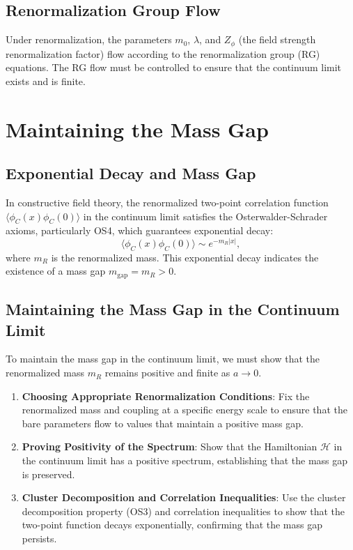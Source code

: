 \subsection{Renormalization Group Flow}

Under renormalization, the parameters \(m_0\), \(\lambda\), and \(Z_\phi\) (the field strength renormalization factor) flow according to the renormalization group (RG) equations. The RG flow must be controlled to ensure that the continuum limit exists and is finite.



\section{Maintaining the Mass Gap}

\subsection{Exponential Decay and Mass Gap}

In constructive field theory, the renormalized two-point correlation function \(\langle \phi_C(x) \phi_C(0) \rangle\) in the continuum limit satisfies the Osterwalder-Schrader axioms, particularly OS4, which guarantees exponential decay:
\begin{equation}
\langle \phi_C(x) \phi_C(0) \rangle \sim e^{-m_R |x|},
\end{equation}
where \(m_R\) is the renormalized mass. This exponential decay indicates the existence of a mass gap \(m_{\text{gap}} = m_R > 0\).

\subsection{Maintaining the Mass Gap in the Continuum Limit}

To maintain the mass gap in the continuum limit, we must show that the renormalized mass \(m_R\) remains positive and finite as \(a \to 0\).

\begin{enumerate}
    \item \textbf{Choosing Appropriate Renormalization Conditions}: Fix the renormalized mass and coupling at a specific energy scale to ensure that the bare parameters flow to values that maintain a positive mass gap.
    
    \item \textbf{Proving Positivity of the Spectrum}: Show that the Hamiltonian \(\mathcal{H}\) in the continuum limit has a positive spectrum, establishing that the mass gap is preserved.
    
    \item \textbf{Cluster Decomposition and Correlation Inequalities}: Use the cluster decomposition property (OS3) and correlation inequalities to show that the two-point function decays exponentially, confirming that the mass gap persists.
\end{enumerate}


